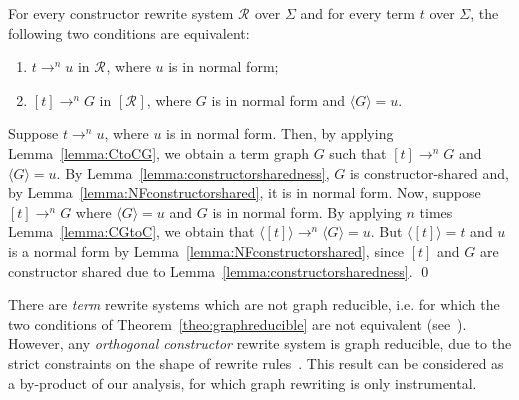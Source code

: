 \documentclass{LMCS}
\newcommand{\termone}{t}
\newcommand{\termtwo}{u}
\newcommand{\sigone}{\Sigma}
\newcommand{\tgone}{G}
\newcommand{\Rules}[1]{\mathcal{R}_{#1}}
\newcommand{\CtoCG}[1]{[#1]}
\newcommand{\CGtoC}[1]{\langle #1\rangle}
\newcommand{\srrone}{\Rules{}}
\newcommand{\rewrTRS}{\rightarrow}
\newcommand{\rewrgraph}{\rightarrow}
\begin{document}
\begin{thm}\label{theo:graphreducible}
For every constructor rewrite system $\srrone$ over $\sigone$ and
for every term $\termone$ over $\sigone$, the following two conditions are
equivalent:
\begin{enumerate}[\em 1.]
\item
  $\termone\rewrTRS^n\termtwo$ in $\srrone$, where $\termtwo$ is in normal form;
\item
  $\CtoCG{\termone}\rewrTRS^n\tgone$ in $\CtoCG{\srrone}$, where $\tgone$ is in normal
  form and $\CGtoC{\tgone}=\termtwo$.
\end{enumerate}
\end{thm}
\proof
Suppose $\termone\rewrgraph^n\termtwo$, where $\termtwo$ is in normal form. 
Then, by applying Lemma~\ref{lemma:CtoCG}, we obtain a term graph $\tgone$ such that
$\CtoCG{\termone}\rewrgraph^n\tgone$ and $\CGtoC{\tgone}=\termtwo$.
By Lemma~\ref{lemma:constructorsharedness}, $\tgone$ is constructor-shared and, by 
Lemma~\ref{lemma:NFconstructorshared}, 
it is in normal form. Now, suppose $\CtoCG{\termone}\rewrgraph^n\tgone$ where
$\CGtoC{\tgone}=\termtwo$ and $\tgone$ is in normal form. By
applying $n$ times Lemma~\ref{lemma:CGtoC}, we obtain
that $\CGtoC{\CtoCG{\termone}}\rewrTRS^n\CGtoC{\tgone}=\termtwo$.
But $\CGtoC{\CtoCG{\termone}}=\termone$ and $\termtwo$ is a normal form 
by Lemma~\ref{lemma:NFconstructorshared}, since 
$\CtoCG{\termone}$ and $\tgone$ are
constructor shared due to Lemma~\ref{lemma:constructorsharedness}.
\qed

There are \emph{term} rewrite systems which are not graph reducible, i.e.
for which the two conditions of Theorem~\ref{theo:graphreducible} are
not equivalent (see~\cite{TGRbarendregt}). However, any 
\emph{orthogonal constructor} rewrite system is graph reducible, due to the 
strict constraints on the shape of rewrite rules~\cite{Plump90ggacs}.
This result can be considered as a by-product of our analysis, for which graph rewriting
is only instrumental.
\end{document}
